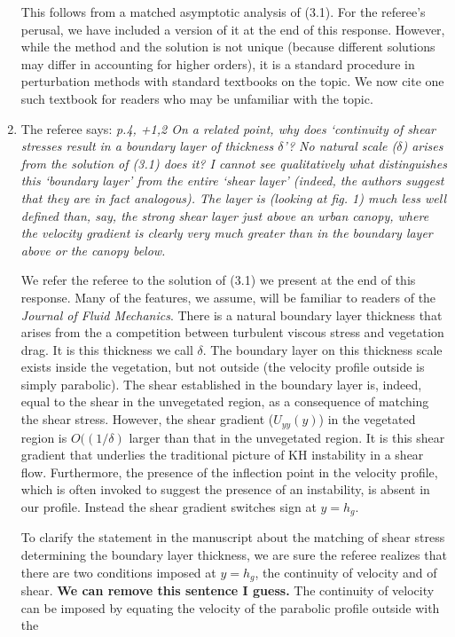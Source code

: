 \documentclass[letterpaper,10pt]{article}
\begin{document}
\begin{enumerate}
This follows from a matched asymptotic analysis of (3.1). For the referee's perusal, we have included a version of it at the end of this response. However, while the method and the solution is not unique (because different solutions may differ in accounting for higher orders), it is a standard procedure in perturbation methods with standard textbooks on the topic. We now cite one such textbook \citep{Hinch1991} for readers who may be unfamiliar with the topic.


\item The referee says:
\textit{
p.4, +1,2 On a related point, why does ‘continuity of shear stresses result in a boundary layer of thickness $\delta$’? No natural scale ($\delta$) arises from the solution of (3.1) does it? I cannot see qualitatively what distinguishes this `boundary layer' from the entire `shear layer' (indeed, the authors suggest that they are in fact analogous). The layer is (looking at fig. 1) much less well defined than, say, the strong shear layer just above an urban canopy, where the velocity gradient is clearly very much greater than in the boundary layer above or the canopy below.
}

We refer the referee to the solution of (3.1) we present at the end of this response.
Many of the features, we assume, will be familiar to readers of the \textit{Journal of Fluid Mechanics}.
There is a natural boundary layer thickness that arises from the a competition between turbulent viscous stress and vegetation drag.
It is this thickness we call $\delta$.
The boundary layer on this thickness scale exists inside the vegetation, but not outside (the velocity profile outside is simply parabolic). 
The shear established in the boundary layer is, indeed, equal to the shear in the unvegetated region, as a consequence of matching the shear stress.
However, the shear gradient ($U_{yy}(y)$) in the vegetated region is $O((1/\delta)$ larger than that in the unvegetated region.
It is this shear gradient that underlies the traditional picture of KH instability in a shear flow.
Furthermore, the presence of the inflection point in the velocity profile, which is often invoked to suggest the presence of an instability, is absent in our profile.
Instead the shear gradient switches sign at $y=h_g$.

To clarify the statement in the manuscript about the matching of shear stress determining the boundary layer thickness, we are sure the referee realizes that there are two conditions imposed at $y=h_g$, the continuity of velocity and of shear.
{\color{red} \textbf{We can remove this sentence I guess.}
The continuity of velocity can be imposed by equating the velocity of the parabolic profile outside with the }



\end{enumerate}
\end{document}
